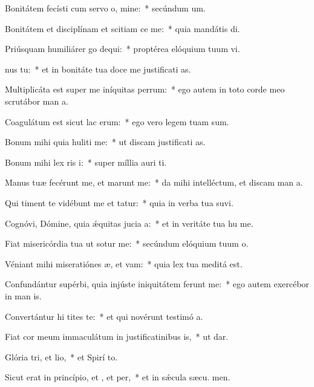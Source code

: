 \item Bonitátem fecísti cum servo o, mine:~* secúndum  um.
\item Bonitátem et disciplínam et scitiam ce me:~* quia mandátis  di.
\item Priúsquam humiliárer go dequi:~* proptérea elóquium tuum vi.
\item {}nus  tu:~* et in bonitáte tua doce me justificati as.
\item Multiplicáta est super me iníquitas perrum:~* ego autem in toto corde meo scrutábor man a.
\item Coagulátum est sicut lac  erum:~* ego vero legem tuam  sum.
\item Bonum mihi quia huliti me:~* ut discam justificati as.
\item Bonum mihi lex ris i:~* super míllia auri  ti.
\item Manus tuæ fecérunt me, et marunt me:~* da mihi intelléctum, et discam man a.
\item Qui timent te vidébunt me et tatur:~* quia in verba tua suvi.
\item Cognóvi, Dómine, quia ǽquitas jucia a:~* et in veritáte tua hu me.
\item Fiat misericórdia tua ut sotur me:~* secúndum elóquium tuum  o.
\item Véniant mihi miseratiónes æ, et vam:~* quia lex tua meditá  est.
\item Confundántur supérbi, quia injúste iniquitátem ferunt  me:~* ego autem exercébor in man is.
\item Convertántur hi tites te:~* et qui novérunt testimó a.
\item Fiat cor meum immaculátum in justificatinibus is,~* ut  dar.
\item Glória tri, et lio,~* et Spirí to.
\item Sicut erat in princípio, et , et per,~* et in sǽcula sæcu. men.

